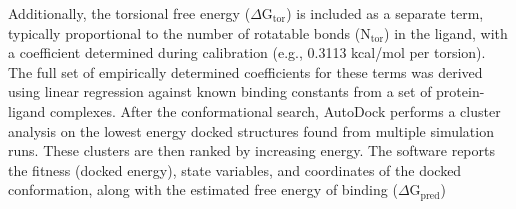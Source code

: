 \documentclass[11pt]{article}
\begin{document}
Additionally, the torsional free energy ($\Delta \text{G}_{\text{tor}}$) is included as a separate term, typically proportional to the number of rotatable bonds ($\text{N}_{\text{tor}}$) in the ligand, with a coefficient determined during calibration (e.g., 0.3113 kcal/mol per torsion). The full set of empirically determined coefficients for these terms was derived using linear regression against known binding constants from a set of protein-ligand complexes.
After the conformational search, AutoDock performs a cluster analysis on the lowest energy docked structures found from multiple simulation runs. These clusters are then ranked by increasing energy. The software reports the fitness (docked energy), state variables, and coordinates of the docked conformation, along with the estimated free energy of binding ($\Delta\text{G}_{\text{pred}}$)
\end{document}
